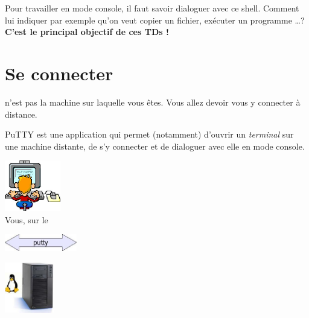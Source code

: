 \documentclass[a4paper,11pt]{style-esi/td}
\begin{document}
		Pour travailler en mode console, il faut savoir dialoguer avec ce shell. 
		Comment lui indiquer par exemple qu'on veut copier un fichier, 
		exécuter un programme \dots ? 
		\textbf{C'est le principal objectif de ces TDs !}

\newpage
	\section{Se connecter}

		 n'est pas la machine sur laquelle vous êtes.
		Vous allez devoir vous y connecter à distance.

		\begin{theorie}{PuTTY}
			\textbf{} est une application qui permet (notamment)
			d'ouvrir un \emph{terminal} sur une machine distante, 
			de s'y connecter et de dialoguer avec elle en mode console.
		\end{theorie}

		\begin{colxbox}[colback=white,halign=center,drop fuzzy shadow]
		\begin{centering}
			\begin{minipage}{10em}
				\centering
				\includegraphics[height=6em]{images/putty1}\\
				{\footnotesize Vous, sur le  }
			\end{minipage}
			\qquad
			\begin{minipage}{8em}
				\centering
				\includegraphics[height=2em]{images/putty2}
			\end{minipage}
			\qquad
			\begin{minipage}{10em}
				\centering
				\includegraphics[height=6em]{images/putty3}\\
				{\footnotesize {}}
			\end{minipage}
		\end{centering}
		\end{colxbox}
\end{document}
